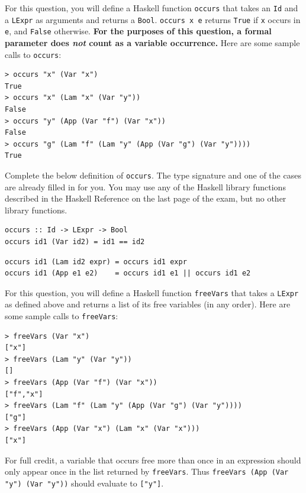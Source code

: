 \documentclass[addpoints]{exam}
\begin{document}
\begin{questions}
\question[10] For this question, you will define a Haskell function \texttt{occurs} that takes an \texttt{Id} and a \texttt{LExpr} as arguments and returns a \texttt{Bool}.  \texttt{occurs x e} returns \texttt{True} if \texttt{x} occurs in \texttt{e}, and \texttt{False} otherwise.  \textbf{For the purposes of this question, a formal parameter does \emph{not} count as a variable occurrence.} Here are some sample calls to \texttt{occurs}:

\begin{verbatim}
> occurs "x" (Var "x")
True
> occurs "x" (Lam "x" (Var "y"))
False
> occurs "y" (App (Var "f") (Var "x"))
False
> occurs "g" (Lam "f" (Lam "y" (App (Var "g") (Var "y"))))
True
\end{verbatim}

Complete the below definition of \texttt{occurs}.  The type signature and one of the cases are already filled in for you.  You may use any of the Haskell library functions described in the Haskell Reference on the last page of the exam, but no other library functions.

\begin{verbatim}
occurs :: Id -> LExpr -> Bool
occurs id1 (Var id2) = id1 == id2
\end{verbatim}
\begin{solutionorbox}[\stretch{1}]
\begin{verbatim}
occurs id1 (Lam id2 expr) = occurs id1 expr
occurs id1 (App e1 e2)    = occurs id1 e1 || occurs id1 e2
\end{verbatim}
\end{solutionorbox}

\newpage

\question[15] For this question, you will define a Haskell function \texttt{freeVars} that takes a \texttt{LExpr} as defined above and returns a list of its free variables (in any order).  Here are some sample calls to \texttt{freeVars}:

\begin{verbatim}
> freeVars (Var "x")
["x"]
> freeVars (Lam "y" (Var "y"))
[]
> freeVars (App (Var "f") (Var "x"))
["f","x"]
> freeVars (Lam "f" (Lam "y" (App (Var "g") (Var "y"))))
["g"]
> freeVars (App (Var "x") (Lam "x" (Var "x")))
["x"]
\end{verbatim}

For full credit, a variable that occurs free more than once in an expression should only appear once in the list returned by \texttt{freeVars}.  Thus \texttt{freeVars (App (Var "y") (Var "y"))} should evaluate to \texttt{["y"]}.


\end{questions}
\end{document}
